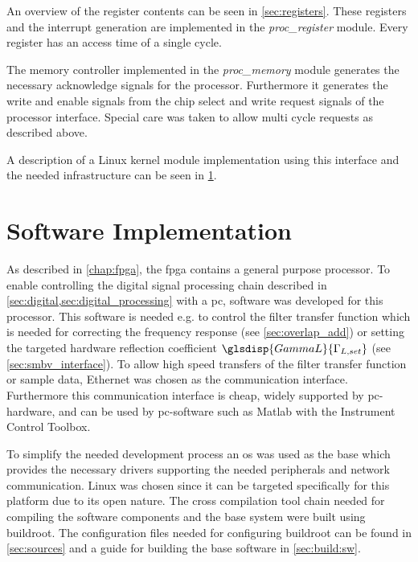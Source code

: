 \documentclass[12pt,a4paper,parskip=full,abstract=true,BCOR=12mm,twoside,open=right]{scrreprt}
\def\device#1{\mbox{\textit{#1}}}
\begin{document}
An overview of the register contents can be seen in \cref{sec:registers}. These
registers and the interrupt generation are implemented in the \device{proc\_register}
module. Every register has an access time of a single cycle.

The memory controller implemented in the \device{proc\_memory} module generates
the necessary acknowledge signals for the processor. Furthermore it generates the
write and enable signals from the chip select and write request signals of the
processor interface. Special care was taken to allow multi cycle requests as
described above.

A description of a Linux kernel module implementation using this interface
and the needed infrastructure can be seen in \cref{chap:software}.


\chapter{Software Implementation}
\label{chap:software}

As described in \cref{chap:fpga}, the \gls{fpga} contains a general
purpose processor. To enable controlling the digital signal processing chain
described in \cref{sec:digital,sec:digital_processing} with a \gls{pc},
software was developed for this processor. This software is needed e.g. to control the
filter transfer function which is needed for correcting the frequency response (see
\cref{sec:overlap_add}) or setting the targeted hardware reflection coefficient $\glsdisp{GammaL}{\Gamma_{L,set}}$ (see
\cref{sec:smbv_interface}). To allow high speed transfers of the filter
transfer function or sample data, Ethernet was chosen as the communication
interface. Furthermore this communication interface is cheap, widely supported
by \gls{pc}-hardware, and can be used by \gls{pc}-software such as Matlab with the
Instrument Control Toolbox.

To simplify the needed development process an \gls{os} was used as the base which
provides the necessary drivers supporting the needed peripherals and
network communication. Linux was chosen since it can be targeted
specifically for this platform due to its open nature. The cross compilation tool
chain needed for compiling the software
components and the base system were built using buildroot\cite{buildroot}. The
configuration files needed for configuring buildroot can be found in
\cref{sec:sources} and a guide for building the base software in \cref{sec:build:sw}.
\end{document}
